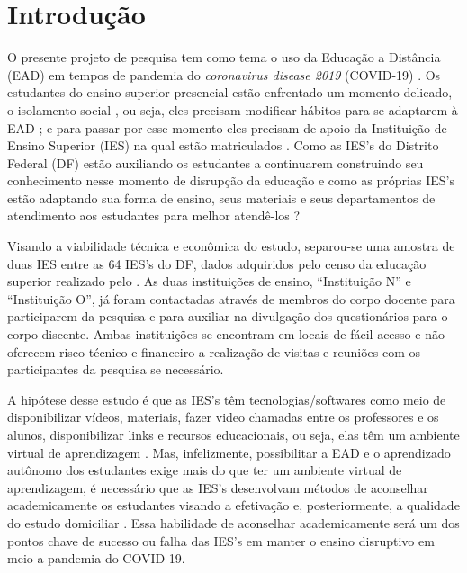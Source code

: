 \documentclass[
	arial,
	12pt,				%
	openright,			%
	twoside,			%
	a4paper,			%
	chapter=TITLE,		%
	english,			%
	french,				%
	spanish,			%
	brazil,				%
	]{abntex2}
\begin{document}
\textual

\chapter*[Introdução]{Introdução} \label{introduction}

O presente projeto de pesquisa tem como tema o uso da Educação a Distância (EAD) em tempos de pandemia  do \textit{coronavirus disease 2019} (COVID-19) . Os estudantes do ensino superior  presencial 
estão enfrentado um momento delicado, o isolamento social , ou seja, eles precisam modificar hábitos para se adaptarem à EAD \cite{zhou2020school}; e para passar por esse momento eles precisam de apoio da Instituição de 
Ensino Superior (IES) na qual estão matriculados \cite{xie2020autonomous}. Como as IES's do Distrito Federal (DF) estão auxiliando os estudantes a continuarem construindo seu conhecimento nesse 
momento de disrupção da educação e como as próprias IES's estão adaptando sua forma de ensino, seus materiais e seus departamentos de atendimento aos estudantes para melhor atendê-los ?

Visando a viabilidade técnica e econômica do estudo, separou-se uma amostra de duas IES entre as 64 IES's do DF, dados adquiridos pelo censo da educação superior  realizado pelo . As duas 
instituições de ensino, ``Instituição N'' e ``Instituição O'', já foram contactadas através de membros do corpo docente para participarem da pesquisa e para auxiliar na divulgação dos questionários para o corpo discente. 
Ambas instituições se encontram em locais de fácil acesso e não oferecem risco técnico e financeiro a realização de visitas e reuniões com os participantes da pesquisa se necessário.  

A hipótese desse estudo é que as IES's têm tecnologias/softwares como meio de disponibilizar vídeos, materiais, fazer video chamadas entre os professores e os alunos, disponibilizar links e recursos educacionais,
ou seja, elas têm um ambiente virtual de aprendizagem . Mas, infelizmente, possibilitar a EAD e o aprendizado autônomo dos estudantes exige mais do que ter um ambiente virtual de aprendizagem, é necessário que as IES's 
desenvolvam métodos de aconselhar academicamente os estudantes visando a efetivação e, posteriormente, a qualidade do estudo domiciliar \cite{xie2020autonomous}. Essa habilidade de aconselhar academicamente
 será um dos pontos chave de sucesso ou falha das IES's em manter o ensino disruptivo  em meio a pandemia  do COVID-19. 
\end{document}
